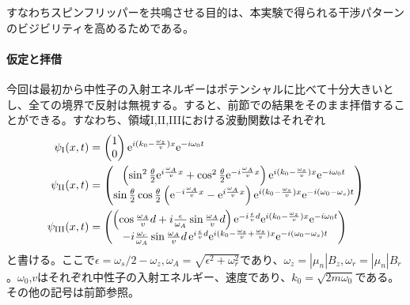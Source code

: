 すなわちスピンフリッパーを共鳴させる目的は、本実験で得られる干渉パターンのビジビリティを高めるためである。



\paragraph{仮定と拝借}
今回は最初から中性子の入射エネルギーはポテンシャルに比べて十分大きいとし、全ての境界で反射は無視する。すると、前節での結果をそのまま拝借することができる。すなわち、領域I,II,IIIにおける波動関数はそれぞれ
\begin{align}
\psi_\mathrm{I}(x,t)&=\begin{pmatrix} 1\\0\end{pmatrix} \mathrm{e}^{i (k_0-\frac{\omega_z}{v})x}\mathrm{e}^{-i\omega_0t}\\
\psi_\mathrm{II}(x,t)&=\begin{pmatrix} \left(\sin^2 \frac{\theta}{2} \mathrm{e}^{i\frac{\omega_A}{v}x} +\cos^2 \frac{\theta}{2} \mathrm{e}^{-i\frac{\omega_A}{v}x} \right) \mathrm{e}^{i(k_0-\frac{\omega_s}{v}) x} \mathrm{e}^{-i\omega_0 t} \\ \sin\frac{\theta}{2}\cos\frac{\theta}{2} \left(\mathrm{e}^{-i\frac{\omega_A}{v}x}-\mathrm{e}^{i\frac{\omega_A}{v}x}\right) \mathrm{e}^{i(k_0-\frac{\omega_s}{v}) x} \mathrm{e}^{-i(\omega_0-\omega_s) t}\end{pmatrix}\\
\psi_\mathrm{III}(x,t)&=\begin{pmatrix} \left(\cos \frac{\omega_A}{v}d +i\frac{\epsilon}{\omega_A} \sin \frac{\omega_A}{v}d\right) \mathrm{e}^{-i\frac{\epsilon}{v} d} \mathrm{e}^{i(k_0-\frac{\omega_z}{v})x}\mathrm{e}^{-i\omega_0t} \\ -i \frac{\omega_r}{\omega_A} \sin \frac{\omega_A}{v}d  \, \mathrm{e}^{i\frac{\epsilon}{v}d} \mathrm{e}^{i(k_0-\frac{\omega_s}{v}+\frac{\omega_z}{v})x}\mathrm{e}^{-i(\omega_0-\omega_s)t} \end{pmatrix}
\end{align}
と書ける。ここで$\epsilon=\omega_s/2-\omega_z,\omega_A=\sqrt{\epsilon^2+\omega_r^2}$であり、$\omega_z=|\mu_n|B_z,\omega_r=|\mu_n|B_r$。$\omega_0$,$v$はそれぞれ中性子の入射エネルギー、速度であり、$k_0=\sqrt{2m\omega_0}$である。その他の記号は前節参照。


